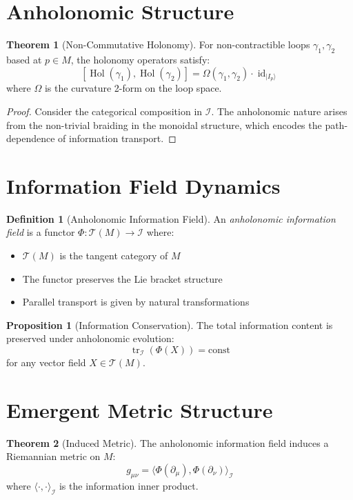 \documentclass[11pt]{article}
\theoremstyle{definition}
\newtheorem{definition}{Definition}
\newtheorem{theorem}{Theorem}
\newtheorem{proposition}{Proposition}
\DeclareMathOperator{\Hol}{Hol}
\DeclareMathOperator{\id}{id}
\DeclareMathOperator{\tr}{tr}
\begin{document}
\section{Anholonomic Structure}

\begin{theorem}[Non-Commutative Holonomy]
For non-contractible loops $\gamma_1, \gamma_2$ based at $p \in M$, the holonomy operators satisfy:
$$[\Hol(\gamma_1), \Hol(\gamma_2)] = \Omega(\gamma_1, \gamma_2) \cdot \id_{|I_p\rangle}$$
where $\Omega$ is the curvature 2-form on the loop space.
\end{theorem}

\begin{proof}
Consider the categorical composition in $\mathcal{I}$. The anholonomic nature arises from the non-trivial braiding in the monoidal structure, which encodes the path-dependence of information transport.
\end{proof}

\section{Information Field Dynamics}

\begin{definition}[Anholonomic Information Field]
An \emph{anholonomic information field} is a functor $\Phi: \mathcal{T}(M) \to \mathcal{I}$ where:
\begin{itemize}
\item $\mathcal{T}(M)$ is the tangent category of $M$
\item The functor preserves the Lie bracket structure
\item Parallel transport is given by natural transformations
\end{itemize}
\end{definition}

\begin{proposition}[Information Conservation]
The total information content is preserved under anholonomic evolution:
$$\tr_{\mathcal{I}}(\Phi(X)) = \text{const}$$
for any vector field $X \in \mathcal{T}(M)$.
\end{proposition}

\section{Emergent Metric Structure}

\begin{theorem}[Induced Metric]
The anholonomic information field induces a Riemannian metric on $M$:
$$g_{\mu\nu} = \langle \Phi(\partial_\mu), \Phi(\partial_\nu) \rangle_{\mathcal{I}}$$
where $\langle \cdot, \cdot \rangle_{\mathcal{I}}$ is the information inner product.
\end{theorem}
\end{document}
